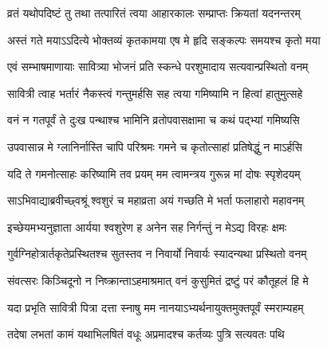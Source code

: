 \twolineshloka
{व्रतं यथोपदिष्टं तु तथा तत्पारितं त्वया}
{आहारकालः सम्प्राप्तः क्रियतां यदनन्तरम्}




\twolineshloka
{अस्तं गते मयाऽऽदित्ये भोक्तव्यं कृतकामया}
{एष मे हृदि सङ्कल्पः समयश्च कृतो मया}




\twolineshloka
{एवं सम्भाषमाणायाः सावित्र्या भोजनं प्रति}
{स्कन्धे परशुमादाय सत्यवान्प्रस्थितो वनम्}


\twolineshloka
{सावित्री त्वाह भर्तारं नैकस्त्वं गन्तुमर्हसि}
{सह त्वया गमिष्यामि न हित्वां हातुमुत्सहे}




\twolineshloka
{वनं न गतपूर्वं ते दुःख पन्थाश्च भामिनि}
{व्रतोपवासक्षामा च कथं पद्भ्यां गमिष्यसि}




\twolineshloka
{उपवासान्न मे ग्लानिर्नास्ति चापि परिश्रमः}
{गमने च कृतोत्साहां प्रतिषेद्धुं न माऽर्हसि}




\twolineshloka
{यदि ते गमनोत्साहः करिष्यामि तव प्रयम्}
{मम त्वामन्त्रय गुरून्न मां दोषः स्पृशेदयम्}




\twolineshloka
{साऽभिवाद्याब्रवीच्छ्वश्रूं श्वशुरं च महाव्रता}
{अयं गच्छति मे भर्ता फलाहारो महावनम्}


\twolineshloka
{इच्छेयमभ्यनुज्ञाता आर्यया श्वशुरेण ह}
{अनेन सह निर्गन्तुं न मेऽद्य विरहः क्षमः}


\twolineshloka
{गुर्वग्निहोत्रार्तकृतेप्रस्थितश्च सुतस्तव}
{न निवार्यो निवार्यः स्यादन्यथा प्रस्थितो वनम्}


\twolineshloka
{संवत्सरः किञ्चिदूनो न निष्क्रान्ताऽहमाश्रमात्}
{वनं कुसुमितं द्रष्टुं परं कौतूहलं हि मे}




\twolineshloka
{यदा प्रभृति सावित्री पित्रा दत्ता स्नाषु मम}
{नानयाऽभ्यर्थनायुक्तमुक्तपूर्वं स्मराम्यहम्}


\twolineshloka
{तदेषा लभतां कामं यथाभिलषितं वधूः}
{अप्रमादश्च कर्तव्यः पुत्रि सत्यवतः पथि}





